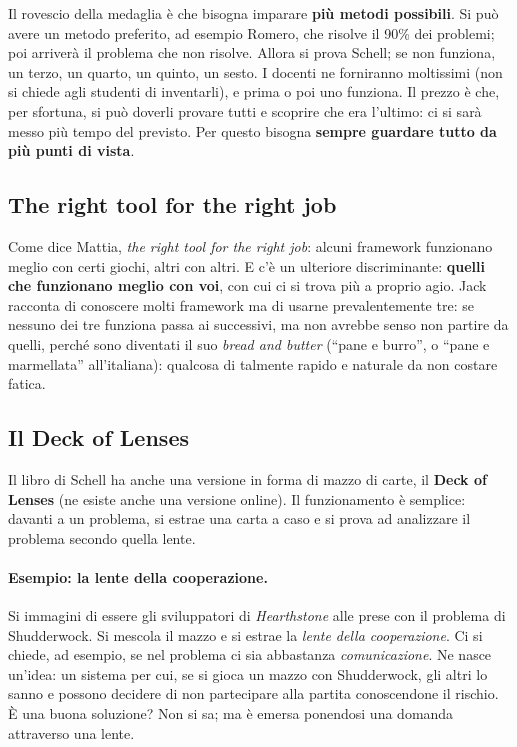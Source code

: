 Il rovescio della medaglia è che bisogna imparare \textbf{più metodi
possibili}. Si può avere un metodo preferito, ad esempio Romero, che risolve
il 90\% dei problemi; poi arriverà il problema che non risolve. Allora si prova
Schell; se non funziona, un terzo, un quarto, un quinto, un sesto. I docenti ne
forniranno moltissimi (non si chiede agli studenti di inventarli), e prima o
poi uno funziona. Il prezzo è che, per sfortuna, si può doverli provare tutti e
scoprire che era l'ultimo: ci si sarà messo più tempo del previsto. Per questo
bisogna \textbf{sempre guardare tutto da più punti di vista}.

\subsection{The right tool for the right job}



Come dice Mattia, \emph{the right tool for the right job}: alcuni framework
funzionano meglio con certi giochi, altri con altri. E c'è un ulteriore
discriminante: \textbf{quelli che funzionano meglio con voi}, con cui ci si
trova più a proprio agio. Jack racconta di conoscere molti framework ma di
usarne prevalentemente tre: se nessuno dei tre funziona passa ai successivi,
ma non avrebbe senso non partire da quelli, perché sono diventati il suo
\emph{bread and butter} (``pane e burro'', o ``pane e marmellata''
all'italiana): qualcosa di talmente rapido e naturale da non costare fatica.

\subsection{Il Deck of Lenses}

Il libro di Schell ha anche una versione in forma di mazzo di carte, il
\textbf{Deck of Lenses} (ne esiste anche una versione online). Il
funzionamento è semplice: davanti a un problema, si estrae una carta a caso e
si prova ad analizzare il problema secondo quella lente.

\paragraph{Esempio: la lente della cooperazione.} Si immagini di essere gli
sviluppatori di \emph{Hearthstone} alle prese con il problema di
Shudderwock. Si mescola il mazzo e si estrae la \emph{lente della
cooperazione}. Ci si chiede, ad esempio, se nel problema ci sia abbastanza
\emph{comunicazione}. Ne nasce un'idea: un sistema per cui, se si gioca un
mazzo con Shudderwock, gli altri lo sanno e possono decidere di non
partecipare alla partita conoscendone il rischio. È una buona soluzione? Non
si sa; ma è emersa ponendosi una domanda attraverso una lente.

